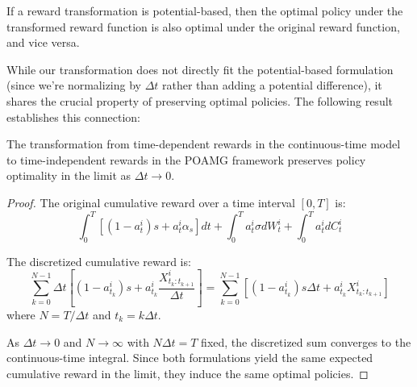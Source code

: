 \begin{theorem}
If a reward transformation is potential-based, then the optimal policy under the transformed reward function is also optimal under the original reward function, and vice versa.
\end{theorem}

While our transformation does not directly fit the potential-based formulation (since we're normalizing by $\Delta t$ rather than adding a potential difference), it shares the crucial property of preserving optimal policies. The following result establishes this connection:

\begin{proposition}
The transformation from time-dependent rewards in the continuous-time model to time-independent rewards in the POAMG framework preserves policy optimality in the limit as $\Delta t \to 0$.
\end{proposition}

\begin{proof}
The original cumulative reward over a time interval $[0, T]$ is:
\begin{equation}
    \int_0^T [(1-a^i_t)s + a^i_t\alpha_s] dt + \int_0^T a^i_t \sigma dW^i_t + \int_0^T a^i_t dC^i_t
\end{equation}

The discretized cumulative reward is:
\begin{equation}
    \sum_{k=0}^{N-1} \Delta t \left[(1-a^i_{t_k})s + a^i_{t_k}\frac{X^i_{t_k:t_{k+1}}}{\Delta t}\right] = \sum_{k=0}^{N-1} [(1-a^i_{t_k})s\Delta t + a^i_{t_k}X^i_{t_k:t_{k+1}}]
\end{equation}
where $N = T/\Delta t$ and $t_k = k\Delta t$.

As $\Delta t \to 0$ and $N \to \infty$ with $N\Delta t = T$ fixed, the discretized sum converges to the continuous-time integral. Since both formulations yield the same expected cumulative reward in the limit, they induce the same optimal policies.
\end{proof}
